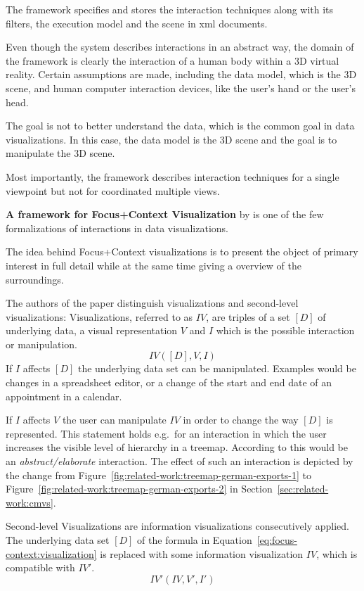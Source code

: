 The framework specifies and stores the interaction techniques along with its filters, the execution model and the scene in \gls{xml} documents.

Even though the system describes interactions in an abstract way, the domain of the framework is clearly the interaction of a human body within a 3D virtual reality.
Certain assumptions are made, including the data model, which is the 3D scene, and human computer interaction devices, like the user's hand or the user's head.

The goal is not to better understand the data, which is the common goal in data visualizations.
In this case, the data model is the 3D scene and the goal is to manipulate the 3D scene.

Most importantly, the framework describes interaction techniques for a single viewpoint but not for coordinated multiple views.

\textbf{A framework for Focus+Context Visualization} by \textcite{Bjork1999} is one of the few formalizations of interactions in data visualizations.

The idea behind Focus+Context visualizations is to present the object of primary interest in full detail while at the same time giving a overview of the surroundings.

The authors of the paper distinguish visualizations and second-level visualizations:
Visualizations, referred to as $IV$, are triples of a set $[D]$ of underlying data, a visual representation $V$ and $I$ which is the possible interaction or manipulation.
\begin{equation}
  IV([D], V, I)
  \label{eq:focus-context:visualization}
\end{equation}
If $I$ affects $[D]$ the underlying data set can be manipulated.
Examples would be changes in a spreadsheet editor, or a change of the start and end date of an appointment in a calendar.

If $I$ affects $V$ the user can manipulate $IV$ in order to change the way $[D]$ is represented.
This statement holds e.g.\ for an interaction in which the user increases the visible level of hierarchy in a treemap.
According to \textcite{Yi2007} this would be an \emph{abstract/elaborate} interaction.
The effect of such an interaction is depicted by the change from Figure~\ref{fig:related-work:treemap-german-exports-1} to Figure~\ref{fig:related-work:treemap-german-exports-2} in Section~\ref{sec:related-work:cmvs}.

Second-level Visualizations are information visualizations consecutively applied.
The underlying data set $[D]$ of the formula in Equation~\ref{eq:focus-context:visualization} is replaced with some information visualization $IV$, which is compatible with $IV'$.
\begin{equation}
  IV'(IV, V', I')
\end{equation}

